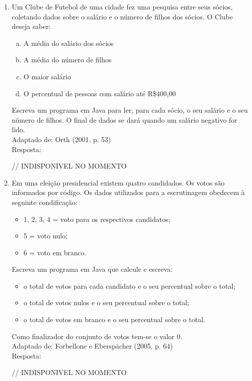 \documentclass[onecolumn,a4paper,10pt]{report}
\newcommand{\+}{\, + \,}
\newcommand{\<}{\hspace*{-0.4cm}}
\begin{document}
\begin{enumerate}[1.]
\item Um Clube de Futebol de uma cidade fez uma pesquisa entre seus sócios, coletando dados sobre o salário e o número de filhos dos sócios. O Clube deseja saber:
\begin{enumerate}[a)]
	\item A média do salário dos sócios
	\item A média do número de filhos
	\item O maior salário
	\item O percentual de pessoas com salário até R\$400,00
\end{enumerate}
Escreva um programa em Java para ler, para cada sócio, o seu salário e o seu número de filhos. O final de dados se dará quando um salário negativo for lido.\\
{\tiny Adaptado de: Orth (2001, p. 53)}\\
Resposta:\\
\begin{javacode}
// INDISPONIVEL NO MOMENTO
\end{javacode}

\item Em uma eleição presidencial existem quatro candidados. Os votos são informados por código. Os dados utilizados para a escrutinagem obedecem à seguinte condificação:
\begin{itemize}
	\item 1, 2, 3, 4 = voto para os respectivos candidatos;
	\item 5 = voto nulo;
	\item 6 = voto em branco.
\end{itemize}
Escreva um programa em Java que calcule e escreva:
\begin{itemize}
	\item o total de votos para cada candidato e o seu percentual sobre o total;
	\item o total de votos nulos e o seu percentual sobre o total;
	\item o total de votos em branco e o seu percentual sobre o total.
\end{itemize}
Como finalizador do conjunto de votos tem-se o valor 0.\\
{\tiny Adaptado de: Forbellone e Eberspächer (2005, p. 64)}\\
Resposta:\\
\begin{javacode}
// INDISPONIVEL NO MOMENTO
\end{javacode}


\end{enumerate}
\end{document}
